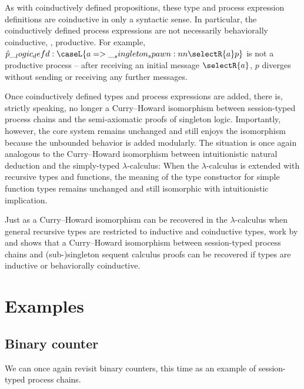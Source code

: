 As with coinductively defined propositions, these type and process expression definitions are coinductive in only a syntactic sense.
In particular, the coinductively defined process expressions are not necessarily behaviorally coinductive, \ie, productive.
For example, $\defp{p} \defd \caseL{a => \spawn{\selectR{a}}{p}}$ is not a productive process -- after receiving an initial message $\selectR{a}$, $p$ diverges without sending or receiving any further messages.

Once coinductively defined types and process expressions are added, there is, strictly speaking, no longer a Curry--Howard isomorphism between session-typed process chains and the semi-axiomatic proofs of singleton logic.
Importantly, however, the core system remains unchanged and still enjoys the isomorphism because the unbounded behavior is added modularly.
The situation is once again analogous to the Curry--Howard isomorphism between intuitionistic natural deduction and the simply-typed $\lambda$-calculus:
When the $\lambda$-calculus is extended with recursive types and functions, the meaning of the type constuctor for simple function types remains unchanged and still isomorphic with intuitionistic implication.

Just as a Curry--Howard isomorphism can be recovered in the $\lambda$-calculus when general recursive types are restricted to inductive and coinductive types, work by \textcite{Derakhshan+Pfenning:LMCS20} and \textcite{Somayyajula+Pfenning:20} shows that a Curry--Howard isomorphism between session-typed process chains and (sub-)singleton sequent calculus proofs can be recovered if types are inductive or behaviorally coinductive.


\section{Examples}\label{sec:process-chain:examples}

\subsection{Binary counter}\label{sec:process-chains:binary-counter}

We can once again revisit binary counters, this time as an example of session-typed process chains.

